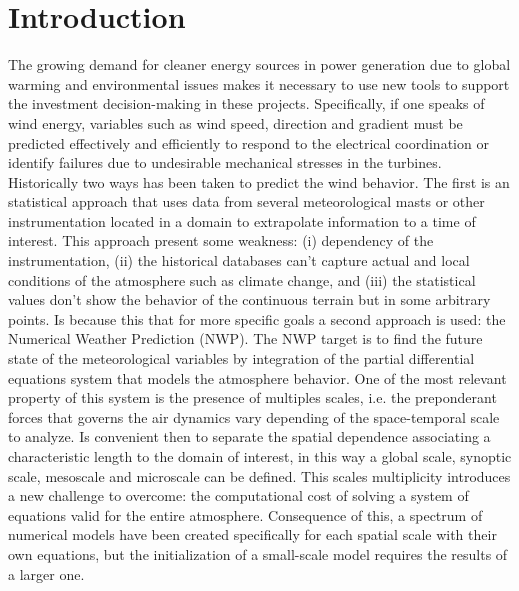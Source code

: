 \section{Introduction}
The growing demand for cleaner energy sources in power generation due to global warming and environmental issues makes it necessary to use new tools to support the investment decision-making in these projects. Specifically, if one speaks of wind energy, variables such as wind speed, direction and gradient must be predicted effectively and efficiently to respond to the electrical coordination or identify failures due to undesirable mechanical stresses in the turbines. Historically two ways has been taken to predict the wind behavior. The first is an statistical approach that uses data from several meteorological masts or other instrumentation located in a domain to extrapolate information to a time of interest. This approach present some weakness: (i) dependency of the instrumentation, (ii) the historical databases can't capture actual and local conditions of the atmosphere such as climate change, and (iii) the statistical values don't show the behavior of the continuous terrain but in some arbitrary points. Is because this that for more specific goals a second approach is used: the Numerical Weather Prediction (NWP). The NWP target is to find the future state of the meteorological variables by integration of the partial differential equations system  that models the atmosphere behavior. One of the most relevant property of this system is the presence of multiples scales, i.e. the preponderant forces that governs the air dynamics vary depending of the space-temporal scale to analyze. Is convenient then to separate the spatial dependence associating a characteristic length to the domain of interest, in this way a global scale, synoptic scale, mesoscale and microscale can be defined.
This scales multiplicity introduces a new challenge to overcome: the computational cost of solving a system of equations valid for the entire atmosphere. Consequence of this, a spectrum of numerical models have been created specifically for each spatial scale with their own equations, but the initialization of a small-scale model requires the results of a larger one.
